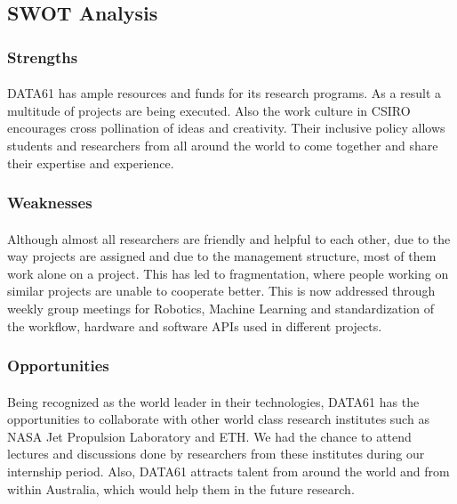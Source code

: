 \newpage
\subsection{SWOT Analysis}

\subsubsection*{Strengths}
\paragraph{}
DATA61 has ample resources and funds for its research programs. As a result a multitude of projects are being executed. Also the work culture in CSIRO encourages cross pollination of ideas and creativity. Their inclusive policy allows students and researchers from all around the world to come together and share their expertise and experience.

\subsubsection*{Weaknesses}
\paragraph{}
Although almost all researchers are friendly and helpful to each other, due to the way projects are assigned and due to the management structure, most of them work alone on a project. This has led to fragmentation, where people working on similar projects are unable to cooperate better. This is now addressed through weekly group meetings for Robotics, Machine Learning and standardization of the workflow, hardware and software APIs used in different projects.


\subsubsection*{Opportunities}
\paragraph{}
Being recognized as the world leader in their technologies, DATA61 has the opportunities to collaborate with other world class research institutes such as NASA Jet Propulsion Laboratory and ETH. We had the chance to attend lectures and discussions done by researchers from these institutes during our internship period. Also, DATA61 attracts talent from around the world and from within Australia, which would help them in the future research.


